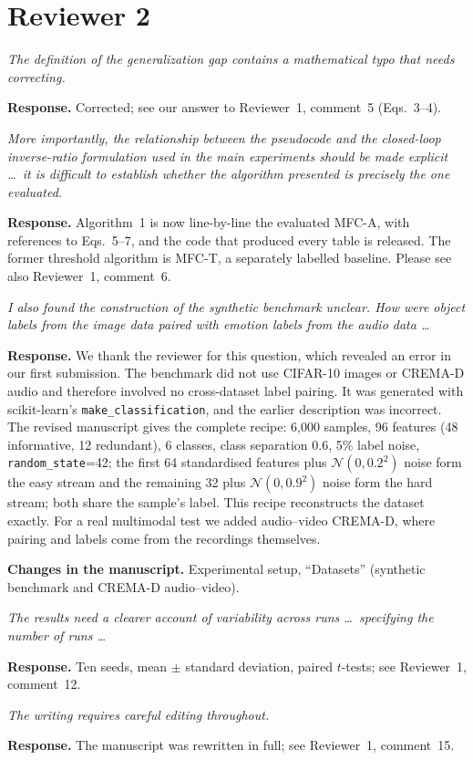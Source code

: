 \documentclass[11pt,a4paper]{article}
\newcommand{\rc}[1]{\par\noindent\colorbox{gray!12}{\parbox{\dimexpr\linewidth-2\fboxsep}{\small\textit{#1}}}\par}
\newcommand{\resp}{\par\noindent\textbf{Response.} }
\newcommand{\chg}{\par\noindent\textbf{Changes in the manuscript.} }
\begin{document}
\section*{Reviewer 2}

\rc{The definition of the generalization gap contains a mathematical typo that needs correcting.}
\resp Corrected; see our answer to Reviewer~1, comment~5 (Eqs.~3--4).

\rc{More importantly, the relationship between the pseudocode and the closed-loop inverse-ratio formulation used in the main experiments should be made explicit \ldots\ it is difficult to establish whether the algorithm presented is precisely the one evaluated.}
\resp Algorithm~1 is now line-by-line the evaluated MFC-A, with references to Eqs.~5--7, and the code that produced every table is released. The former threshold algorithm is MFC-T, a separately labelled baseline. Please see also Reviewer~1, comment~6.

\rc{I also found the construction of the synthetic benchmark unclear. How were object labels from the image data paired with emotion labels from the audio data \ldots}
\resp We thank the reviewer for this question, which revealed an error in our first submission. The benchmark did not use CIFAR-10 images or CREMA-D audio and therefore involved no cross-dataset label pairing. It was generated with scikit-learn's \texttt{make\_classification}, and the earlier description was incorrect. The revised manuscript gives the complete recipe: 6,000 samples, 96 features (48 informative, 12 redundant), 6 classes, class separation 0.6, 5\% label noise, \texttt{random\_state}=42; the first 64 standardised features plus $\mathcal{N}(0,0.2^2)$ noise form the easy stream and the remaining 32 plus $\mathcal{N}(0,0.9^2)$ noise form the hard stream; both share the sample's label. This recipe reconstructs the dataset exactly. For a real multimodal test we added audio--video CREMA-D, where pairing and labels come from the recordings themselves.
\chg Experimental setup, ``Datasets'' (synthetic benchmark and CREMA-D audio--video).

\rc{The results need a clearer account of variability across runs \ldots\ specifying the number of runs \ldots}
\resp Ten seeds, mean $\pm$ standard deviation, paired $t$-tests; see Reviewer~1, comment~12.

\rc{The writing requires careful editing throughout.}
\resp The manuscript was rewritten in full; see Reviewer~1, comment~15.
\end{document}
